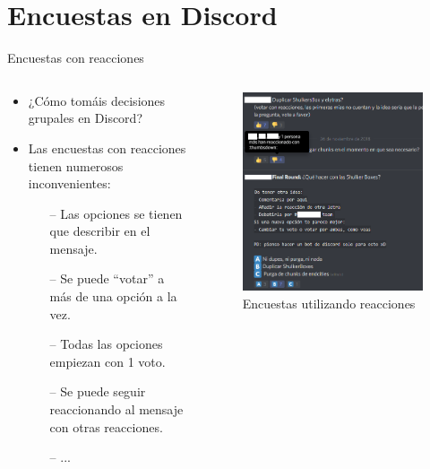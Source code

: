\documentclass[10pt]{beamer} %
\begin{document}
\section{Encuestas en Discord}
\begin{frame}{Encuestas con reacciones}
\begin{columns}
\begin{column}{.5\linewidth}
    \begin{itemize}
        \item ¿Cómo tomáis decisiones grupales en Discord?
        \item Las encuestas con reacciones tienen numerosos inconvenientes:
        \begin{itemize}
            \item[--] Las opciones se tienen que describir en el mensaje.
            \item[--] Se puede ``votar'' a más de una opción a la vez.
            \item[--] Todas las opciones empiezan con 1 voto.
            \item[--] Se puede seguir reaccionando al mensaje con otras reacciones.
            \item[--] ...
        \end{itemize}
    \end{itemize}
\end{column}
\begin{column}{.5\linewidth}
    	\begin{figure}[h]
		\includegraphics[width=\linewidth,]{naive_polls.png}%
		\caption{Encuestas utilizando reacciones}
		\label{fig:reacciones}
		\end{figure}
\end{column}
\end{columns}
\end{frame}
\end{document}

